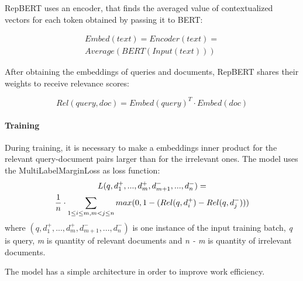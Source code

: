 \documentclass[
    twocolumn,
]{ceurart}
\begin{document}
    RepBERT uses an encoder, that finds the averaged value of contextualized vectors for each token
    obtained by passing it to BERT:

    \begin{multline}
        Embed(text)=Encoder(text)=\\
        Average(BERT(Input(text)))
    \end{multline}

    After obtaining the embeddings of queries and documents, RepBERT shares their weights
    to receive relevance scores:

    \begin{equation}
        Rel(query,doc) = Embed(query)^T \cdot Embed(doc)
    \end{equation}

    \paragraph{Training}
    During training, it is necessary to make a embeddings inner product for the relevant
    query-document pairs larger than for the irrelevant ones.
    The model uses the MultiLabelMarginLoss as loss function:
    \begin{multline}
        \mathnormal{L}(q,d_1^+,...,d_m^+,d_{m+1}^-,...,d_n^-) = \\
        \frac{1}{n} \cdot \sum_{1 \leq i \leq m,m < j \leq n}
        max(0, 1 - (Rel(q,d_i^+) - Rel(q,d_j^-)))
    \end{multline}
    where $(q,d_1^+,...,d_m^+,d_{m+1}^-,...,d_n^-)$ is one instance of the input training batch,
    \emph{q} is query, \emph{m} is quantity of relevant documents and \emph{n - m} is quantity
    of irrelevant documents\cite{RepBERT}.\\\par
    The model has a simple architecture in order to improve work efficiency.

\end{document}
